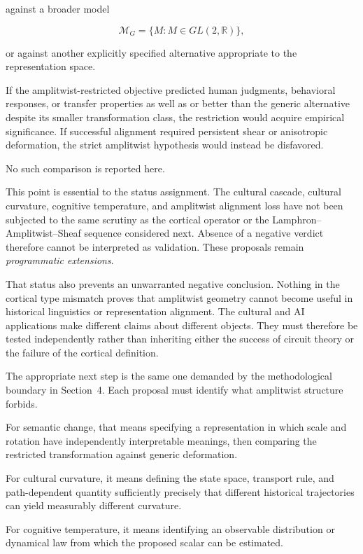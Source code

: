\documentclass[11pt]{article}
\begin{document}
against a broader model

\begin{equation}
\mathcal M_G
=
\{M:M\in GL(2,\mathbb R)\},
\end{equation}

or against another explicitly specified alternative appropriate to the representation space.

If the amplitwist-restricted objective predicted human judgments, behavioral responses, or transfer properties as well as or better than the generic alternative despite its smaller transformation class, the restriction would acquire empirical significance. If successful alignment required persistent shear or anisotropic deformation, the strict amplitwist hypothesis would instead be disfavored.

No such comparison is reported here.

This point is essential to the status assignment. The cultural cascade, cultural curvature, cognitive temperature, and amplitwist alignment loss have not been subjected to the same scrutiny as the cortical operator or the Lamphron--Amplitwist--Sheaf sequence considered next. Absence of a negative verdict therefore cannot be interpreted as validation. These proposals remain \emph{programmatic extensions}.

That status also prevents an unwarranted negative conclusion. Nothing in the cortical type mismatch proves that amplitwist geometry cannot become useful in historical linguistics or representation alignment. The cultural and AI applications make different claims about different objects. They must therefore be tested independently rather than inheriting either the success of circuit theory or the failure of the cortical definition.

The appropriate next step is the same one demanded by the methodological boundary in Section~4. Each proposal must identify what amplitwist structure forbids.

For semantic change, that means specifying a representation in which scale and rotation have independently interpretable meanings, then comparing the restricted transformation against generic deformation.

For cultural curvature, it means defining the state space, transport rule, and path-dependent quantity sufficiently precisely that different historical trajectories can yield measurably different curvature.

For cognitive temperature, it means identifying an observable distribution or dynamical law from which the proposed scalar can be estimated.
\end{document}
